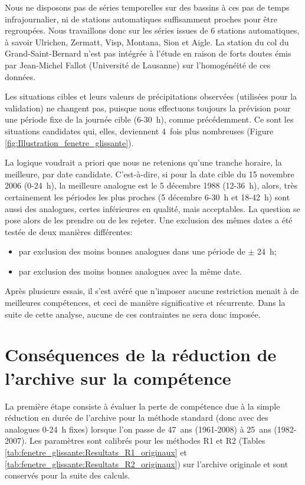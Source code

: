 \documentclass[hess]{copernicus}
\begin{document}
Nous ne disposons pas de séries temporelles sur des bassins à ces pas de temps infrajournalier, ni de stations automatiques suffisamment proches pour être regroupées. Nous travaillons donc sur les séries issues de 6 stations automatiques, à savoir Ulrichen, Zermatt, Visp, Montana, Sion et Aigle. La station du col du Grand-Saint-Bernard n'est pas intégrée à l'étude en raison de forts doutes émis par Jean-Michel Fallot (Université de Lausanne) sur l'homogénéité de ces données.

Les situations cibles et leurs valeurs de précipitations observées (utilisées pour la validation) ne changent pas, puisque nous effectuons toujours la prévision pour une période fixe de la journée cible (6-30~h), comme précédemment. Ce sont les situations candidates qui, elles, deviennent 4~fois plus nombreuses (Figure \ref{fig:Illustration_fenetre_glissante}).

La logique voudrait a priori que nous ne retenions qu'une tranche horaire, la meilleure, par date candidate. C'est-à-dire, si pour la date cible du 15 novembre 2006 (0-24~h), la meilleure analogue est le 5 décembre 1988 (12-36~h), alors, très certainement les périodes les plus proches (5 décembre 6-30~h et 18-42~h) sont aussi des analogues, certes inférieures en qualité, mais acceptables. La question se pose alors de les prendre ou de les rejeter. Une exclusion des mêmes dates a été testée de deux manières différentes:
\begin{itemize}
	\item par exclusion des moins bonnes analogues dans une période de $\pm$ 24~h;
	\item par exclusion des moins bonnes analogues avec la même date.
\end{itemize}
Après plusieurs essais, il s'est avéré que n'imposer aucune restriction menait à de meilleures compétences, et ceci de manière significative et récurrente. Dans la suite de cette analyse, aucune de ces contraintes ne sera donc imposée.


\section{Conséquences de la réduction de l'archive sur la compétence}

La première étape consiste à évaluer la perte de compétence due à la simple réduction en durée de l'archive pour la méthode standard (donc avec des analogues 0-24~h fixes) lorsque l'on passe de 47~ans (1961-2008) à 25~ans (1982-2007). Les paramètres sont calibrés pour les méthodes R1 et R2 (Tables \ref{tab:fenetre_glissante:Resultats_R1_originaux} et \ref{tab:fenetre_glissante:Resultats_R2_originaux}) sur l'archive originale et sont conservés pour la suite des calculs. 
\end{document}
